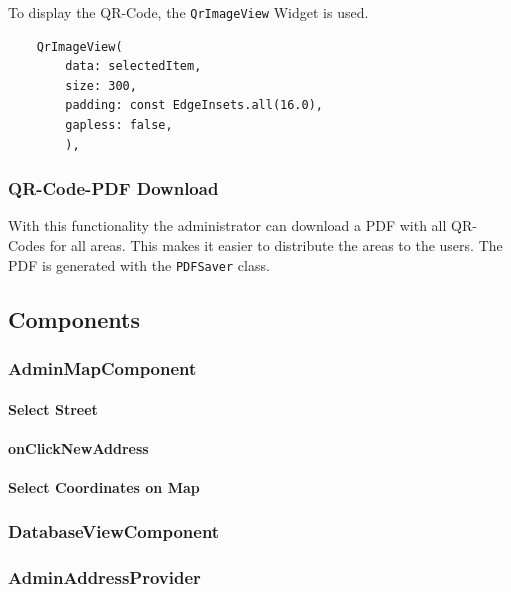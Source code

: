 To display the QR-Code, the \texttt{QrImageView} Widget is used. 

\lstset{style=mycsharp, caption=QrCode Generation in ListEditPage}
\begin{lstlisting}
    QrImageView(
        data: selectedItem,
        size: 300,
        padding: const EdgeInsets.all(16.0),
        gapless: false,
        ),
\end{lstlisting}

\subsubsection{QR-Code-PDF Download}
With this functionality the administrator can download a PDF with all QR-Codes for all areas. This makes it easier to distribute the areas to the users. The PDF is generated with the \texttt{PDFSaver} class.




\subsection{Components}

\subsubsection{AdminMapComponent}
\label{fig:AdminMapComponent}




\paragraph{Select Street}
\label{fig:Select Street}

\paragraph{onClickNewAddress}

\paragraph{Select Coordinates on Map}
\label{fig:Select Coordinates on Map}

\subsubsection{DatabaseViewComponent}
\label{fig:DatabaseViewComponent}

\subsubsection{AdminAddressProvider}

